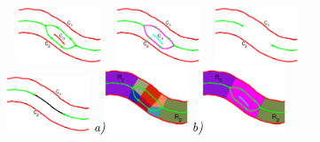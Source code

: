 
\begin{figure}[!ht]
\centering
{\footnotesize\textit{\textcolor{white}{a)}}}\includegraphics[width=0.22\textwidth]{figs/lsc_l1.pdf}  
{\footnotesize\textit{\textcolor{white}{a)}}}\includegraphics[width=0.22\textwidth]{figs/lsc_l2.pdf}  
{\footnotesize\textit{\textcolor{white}{a)}}}\includegraphics[width=0.22\textwidth]{figs/lsc_l3.pdf} 
{\footnotesize\textit{\textcolor{white}{a)}}}\includegraphics[width=0.22\textwidth]{figs/lsc_l4.pdf} 
{\footnotesize\textit{\textcolor{black}{a)}}}\includegraphics[width=0.22\textwidth]{figs/lsc_l5.pdf}
{\footnotesize\textit{\textcolor{black}{b)}}}\includegraphics[width=0.22\textwidth]{figs/lsc_l6.pdf}

\end{figure}
